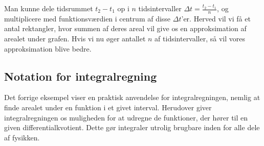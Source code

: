 Man kunne dele tidsrummet $t_2 - t_1$ op i $n$ tidsintervaller 
$\Delta t = \frac{t_2-t_1}{n}$, og multiplicere med funktionsværdien 
i centrum af disse $\Delta t$'er. Herved vil vi få et antal rektangler,
hvor summen af deres areal vil give os en approksimation af arealet under
grafen. Hvis vi nu øger antallet $n$ af tidsintervaller, så vil vores
approksimation blive bedre.


\subsection{Notation for integralregning}
Det forrige eksempel viser en praktisk anvendelse for integralregningen,
nemlig at finde arealet under en funktion i et givet interval.
Herudover giver integralregningen os muligheden for at udregne de funktioner,
der hører til en given differentialkvotient. Dette gør integraler utrolig
brugbare inden for alle dele af fysikken.

